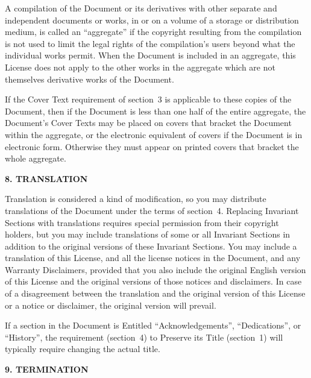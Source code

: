 \begin{scriptsize}
\begin{multicols}{2}
    A compilation of the Document or its derivatives with other separate and independent documents or works, in or on a volume of a storage or distribution medium, is called an ``aggregate'' if the copyright resulting from the compilation is not used to limit the legal rights of the compilation's users beyond what the individual works permit. When the Document is included in an aggregate, this License does not apply to the other works in the aggregate which are not themselves derivative works of the Document.

    If the Cover Text requirement of section~3 is applicable to these copies of the Document, then if the Document is less than one half of the entire aggregate, the Document's Cover Texts may be placed on covers that bracket the Document within the aggregate, or the electronic equivalent of covers if the Document is in electronic form. Otherwise they must appear on printed covers that bracket the whole aggregate.

    \begin{center}
      {\bf 8. TRANSLATION\par}
    \end{center}


    Translation is considered a kind of modification, so you may distribute translations of the Document under the terms of section~4. Replacing Invariant Sections with translations requires special permission from their copyright holders, but you may include translations of some or all Invariant Sections in addition to the original versions of these Invariant Sections.  You may include a translation of this License, and all the license notices in the Document, and any Warranty Disclaimers, provided that you also include the original English version of this License and the original versions of those notices and disclaimers.  In case of a disagreement between the translation and the original version of this License or a notice or disclaimer, the original version will prevail.

    If a section in the Document is Entitled ``Acknowledgements'', ``Dedications'', or ``History'', the requirement (section~4) to Preserve its Title (section~1) will typically require changing the actual title.

    \begin{center}
      {\bf 9. TERMINATION\par}
    \end{center}


\end{multicols}
\end{scriptsize}
